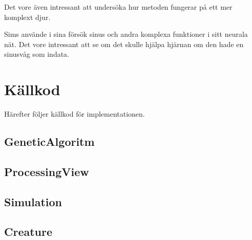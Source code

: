 \documentclass[titlepage, twocolumn, a4paper, 11pt, swedish]{article}
\begin{document}
Det vore även intressant att undersöka hur metoden fungerar på ett mer komplext djur. 

Sims använde i sina försök sinus och andra komplexa funktioner i sitt neurala nät. Det vore intressant att se om det skulle hjälpa hjärnan om den hade en sinusvåg som indata.








\onecolumn
\newpage
\appendix
{}
\section{Källkod}\label{sec:kallkod}
Härefter följer källkod för implementationen.

\subsection{GeneticAlgoritm}\label{app:GeneticAlgoritm}
\begin{footnotesize}
  
\end{footnotesize}

\subsection{ProcessingView}\label{app:ProcessingView}
\begin{footnotesize}
  
\end{footnotesize}

\subsection{Simulation}\label{app:Simulation}
\begin{footnotesize}
  
\end{footnotesize}

\subsection{Creature}\label{app:Creature}
\begin{footnotesize}
  
\end{footnotesize}
\end{document}
